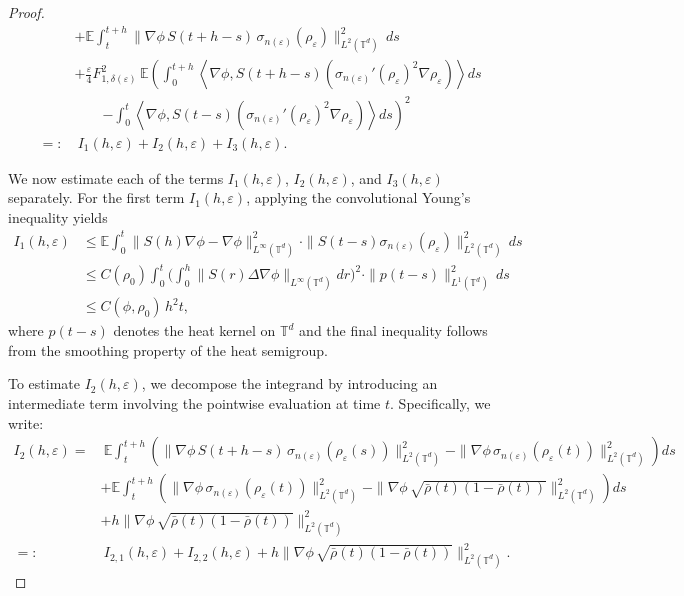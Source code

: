 \documentclass[10pt,a4paper]{amsart}
\def\leq{\leqslant}
\begin{document}
\begin{proof}
\begin{align*}
&+ \mathbb{E} \int_t^{t+h} \| \nabla\phi\, S(t+h - s)\, \sigma_{n(\varepsilon)}(\rho_{\varepsilon}) \|_{L^2(\mathbb{T}^d)}^2\, ds \\
&+ \frac{\varepsilon}{4} F_{1,\delta(\varepsilon)}^2\, \mathbb{E} \left( \int_0^{t+h} \left\langle \nabla\phi, S(t+h - s) \left( \sigma_{n(\varepsilon)}'(\rho_{\varepsilon})^2 \nabla \rho_{\varepsilon} \right) \right\rangle ds \right. \\
&\qquad \left. - \int_0^t \left\langle \nabla\phi, S(t - s) \left( \sigma_{n(\varepsilon)}'(\rho_{\varepsilon})^2 \nabla \rho_{\varepsilon} \right) \right\rangle ds \right)^2 \\
=:&\ I_1(h,\varepsilon) + I_2(h,\varepsilon) + I_3(h,\varepsilon).
\end{align*}

We now estimate each of the terms $I_1(h,\varepsilon)$, $I_2(h,\varepsilon)$, and $I_3(h,\varepsilon)$ separately. For the first term $I_1(h,\varepsilon)$, applying the convolutional Young's inequality yields
\begin{align*}
I_1(h,\varepsilon) 
&\leq \mathbb{E} \int_0^t \| S(h)\nabla\phi - \nabla\phi \|_{L^\infty(\mathbb{T}^d)}^2 
\cdot \| S(t - s)\sigma_{n(\varepsilon)}(\rho_{\varepsilon}) \|_{L^{2}(\mathbb{T}^d)}^2\, ds \\
&\leq C(\rho_0)\int_0^t \Big(\int^h_0\| S(r)\Delta\nabla\phi \|_{L^\infty(\mathbb{T}^d)}dr\Big)^2 
\cdot \| p(t - s) \|_{L^1(\mathbb{T}^d)}^2\, ds \\
&\leq C(\phi,\rho_0)\, h^2 t,
\end{align*}
where $p(t - s)$ denotes the heat kernel on $\mathbb{T}^d$ and the final inequality follows from the smoothing property of the heat semigroup.


To estimate $I_2(h,\varepsilon)$, we decompose the integrand by introducing an intermediate term involving the pointwise evaluation at time $t$. Specifically, we write:
\begin{align*}
I_2(h,\varepsilon) 
=&\ \mathbb{E} \int_t^{t+h} \left( \| \nabla\phi\, S(t+h-s)\, \sigma_{n(\varepsilon)}(\rho_{\varepsilon}(s)) \|_{L^2(\mathbb{T}^d)}^2 
- \| \nabla\phi\, \sigma_{n(\varepsilon)}(\rho_{\varepsilon}(t)) \|_{L^2(\mathbb{T}^d)}^2 \right) ds \\
&+ \mathbb{E} \int_t^{t+h} \left( \| \nabla\phi\, \sigma_{n(\varepsilon)}(\rho_{\varepsilon}(t)) \|_{L^2(\mathbb{T}^d)}^2 
- \| \nabla\phi\, \sqrt{\bar{\rho}(t)(1 - \bar{\rho}(t))} \|_{L^2(\mathbb{T}^d)}^2 \right) ds \\
&+ h \| \nabla\phi\, \sqrt{\bar{\rho}(t)(1 - \bar{\rho}(t))} \|_{L^2(\mathbb{T}^d)}^2 \\
=:&\ I_{2,1}(h,\varepsilon) + I_{2,2}(h,\varepsilon) + h \| \nabla\phi\, \sqrt{\bar{\rho}(t)(1 - \bar{\rho}(t))} \|_{L^2(\mathbb{T}^d)}^2.
\end{align*}


\end{proof}
\end{document}
